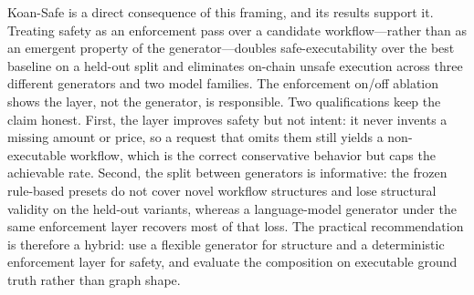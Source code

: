 Koan-Safe is a direct consequence of this framing, and its results support it.
Treating safety as an enforcement pass over a candidate workflow---rather than
as an emergent property of the generator---doubles safe-executability over the
best baseline on a held-out split and eliminates on-chain unsafe execution
across three different generators and two model families. The enforcement
on/off ablation shows the layer, not the generator, is responsible. Two
qualifications keep the claim honest. First, the layer improves safety but not
intent: it never invents a missing amount or price, so a request that omits
them still yields a non-executable workflow, which is the correct conservative
behavior but caps the achievable rate. Second, the split between generators is
informative: the frozen rule-based presets do not cover novel workflow
structures and lose structural validity on the held-out variants, whereas a
language-model generator under the same enforcement layer recovers most of that
loss. The practical recommendation is therefore a hybrid: use a flexible
generator for structure and a deterministic enforcement layer for safety, and
evaluate the composition on executable ground truth rather than graph shape.
